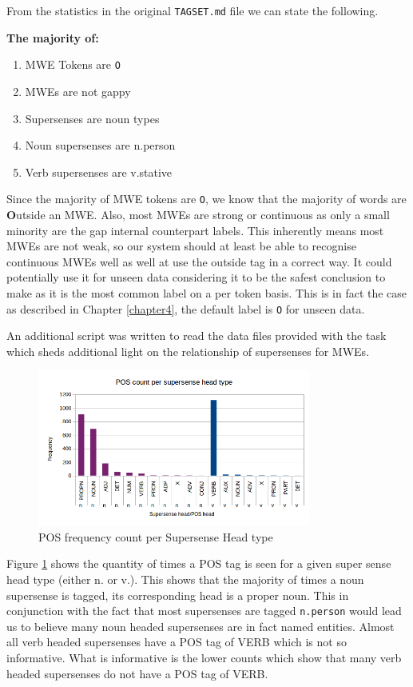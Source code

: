 From the statistics in the original \texttt{TAGSET.md} file we can state the following.

{\bf The majority of:}
\begin{enumerate}
  \setlength{\itemsep}{0pt}
  \setlength{\parskip}{0pt}
\item MWE Tokens are \texttt{O}
\item MWEs are not gappy
\item Supersenses are noun types
\item Noun supersenses are n.person
\item Verb supersenses are v.stative
\end{enumerate}

Since the majority of MWE tokens are \texttt{O}, we know that the majority of words are {\bf O}utside an MWE. Also, most MWEs are strong or continuous as only a small minority are the gap internal counterpart labels. This inherently means most MWEs are not weak, so our system should at least be able to recognise continuous MWEs well as well at use the outside tag in a correct way. It could potentially use it for unseen data considering it to be the safest conclusion to make as it is the most common label on a per token basis. This is in fact the case as described in Chapter \ref{chapter4}, the default label is \texttt{O} for unseen data.

An additional script was written to read the data files provided with the task which sheds additional light on the relationship of supersenses for MWEs.

\begin{figure}[H]
\centering
\includegraphics[width=0.8\textwidth]{images/pos_ss_freq.png}
\caption{POS frequency count per Supersense Head type}
\label{fig:posfreqperss}
\end{figure}

Figure \ref{fig:posfreqperss} shows the quantity of times a POS tag is seen for a given super sense head type (either n. or v.). This shows that the majority of times a noun supersense is tagged, its corresponding head is a proper noun. This in conjunction with the fact that most supersenses are tagged \texttt{n.person} would lead us to believe many noun headed supersenses are in fact named entities. Almost all verb headed supersenses have a POS tag of VERB which is not so informative. What is informative is the lower counts which show that many verb headed supersenses do not have a POS tag of VERB. 


